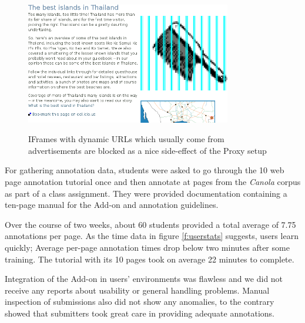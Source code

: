 \begin{figure}
	{\includegraphics[width=0.8\textwidth]{add}}
\caption{\label{f:iframes}IFrames with dynamic URLs which usually come from advertisements are blocked as a nice side-effect of the Proxy setup}
\end{figure}

For gathering annotation data, students were asked to go through the 10 web page annotation tutorial once and then annotate at pages from the \textit{Canola} corpus as part of a class assignment.
They were provided documentation containing a ten-page manual for the Add-on and annotation guidelines.

Over the course of two weeks, about 60 students provided a total average of 7.75 annotations per page.
As the time data in figure \ref{f:userstats} suggests, users learn quickly; 
Average per-page annotation times drop below two minutes after some training.
The tutorial with its 10 pages took on average 22 minutes to complete.

Integration of the Add-on in users' environments was flawless and we did not receive any reports about usability or general handling problems.
Manual inspection of submissions also did not show any anomalies, to the contrary showed that submitters took great care in providing adequate annotations.


